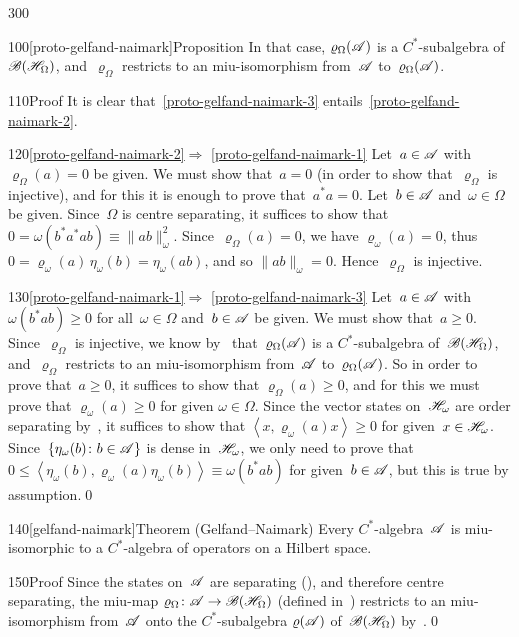 \begin{parsec}{300}
\begin{point}{100}[proto-gelfand-naimark]{Proposition}
In that case, $\varrho_\Omega(\mathscr{A})$ is a $C^*$-subalgebra
of~$\mathscr{B}(\mathscr{H}_\Omega)$,
and~$\varrho_\Omega$
restricts to an miu-isomorphism from~$\mathscr{A}$ to~$\varrho_\Omega(\mathscr{A})$.
\begin{point}{110}{Proof}%
It is clear that~\ref{proto-gelfand-naimark-3}
entails~\ref{proto-gelfand-naimark-2}.
\begin{point}{120}{\ref{proto-gelfand-naimark-2}$\Longrightarrow$%
\ref{proto-gelfand-naimark-1}}%
Let~$a\in \mathscr{A}$ with $\varrho_\Omega(a)=0$ be given.
We must show that~$a=0$ (in order to show that~$\varrho_\Omega$
is injective),
and for this it is enough to prove that~$a^*a=0$.
Let~$b\in\mathscr{A}$ and~$\omega\in\Omega$ be given.
Since~$\Omega$ is centre separating,
it suffices to show that $0=\omega(b^*a^*ab) \equiv \|ab\|_\omega^2$.
Since~$\varrho_\Omega(a)=0$,
we have $\varrho_\omega(a)=0$,
thus $0=\varrho_\omega(a)\,\eta_\omega(b)
=\eta_\omega(ab)$,
and so $\|ab\|_\omega=0$.
Hence~$\varrho_\Omega$ is injective.
\end{point}
\begin{point}{130}{\ref{proto-gelfand-naimark-1}$\Longrightarrow$%
\ref{proto-gelfand-naimark-3}}%
Let~$a\in\mathscr{A}$ with $\omega(b^*a b)\geq 0$
for all~$\omega\in\Omega$ and~$b\in\mathscr{A}$
be given.
We must show that~$a\geq 0$.
Since~$\varrho_\Omega$ is injective,
we know by~
that~$\varrho_\Omega(\mathscr{A})$ is a $C^*$-subalgebra
of~$\mathscr{B}(\mathscr{H}_\Omega)$,
and~$\varrho_\Omega$ restricts to an miu-isomorphism
from~$\mathscr{A}$ to~$\varrho_\Omega(\mathscr{A})$.
So in order to prove that~$a\geq 0$,
it suffices to show that $\varrho_\Omega(a)\geq 0$,
and for this we must prove that $\varrho_\omega(a)\geq 0$
for given $\omega\in \Omega$.
Since the vector states on~$\mathscr{H}_\omega$ are order separating
by~, it suffices to show that 
$\left<x,\varrho_\omega(a)x\right>\geq 0$
for given~$x\in \mathscr{H}_\omega$.
Since~$\{\eta_\omega(b)\colon b\in\mathscr{A}\}$
is dense in~$\mathscr{H}_\omega$,
we only need to prove 
that~$0\leq \left<\eta_\omega(b),\varrho_\omega(a)\eta_\omega(b)\right>
\equiv \omega(b^*ab)$ for given~$b\in \mathscr{A}$,
but this is true
by assumption.\qed
\end{point}
\end{point}
\end{point}
\begin{point}{140}[gelfand-naimark]{Theorem (Gelfand--Naimark)}%
Every $C^*$-algebra~$\mathscr{A}$ is miu-isomorphic
to a $C^*$-algebra of operators on a Hilbert space.
\begin{point}{150}{Proof}%
Since the states on~$\mathscr{A}$
are separating
(),
and therefore centre separating,
the miu-map $\varrho_\Omega\colon \mathscr{A}\to\mathscr{B}(\mathscr{H}_\Omega)$
(defined in~)
restricts to an miu-isomorphism
from~$\mathscr{A}$ onto the $C^*$-subalgebra
$\varrho(\mathscr{A})$ of~$\mathscr{B}(\mathscr{H}_\Omega)$
by~.\qed
\end{point}
\end{point}
\end{parsec}
